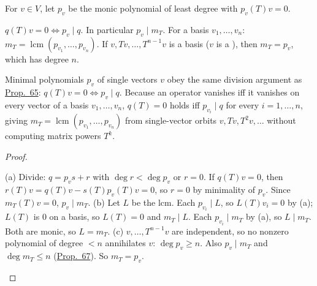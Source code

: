 \documentclass[10pt]{scrartcl}
\begin{document}
\begin{proposition*}\hypertarget{name-f7-one-vector-at-a-time}{}\label{name-f7-one-vector-at-a-time}
  For $v\in V$, let $p_v$ be the monic polynomial of least degree with $p_v(T)v=0$.
  \begin{enumerate}[(a)]
    \ii $q(T)v=0\iff p_v\mid q$. In particular $p_v\mid m_T$.
    \ii For a basis $v_1,\dots,v_n$: $m_T=\operatorname{lcm}(p_{v_1},\dots,p_{v_n})$.
    \ii If $v,Tv,\dots,T^{n-1}v$ is a basis ($v$ is a ), then $m_T=p_v$, which has degree $n$.
  \end{enumerate}
\end{proposition*}
\begin{ideabox}
Minimal polynomials $p_v$ of single vectors $v$ obey the same division argument as \hyperref[prop-65]{Prop.~65}: $q(T)v=0\iff p_v\mid q$. Because an operator vanishes iff it vanishes on every vector of a basis $v_1,\dots,v_n$, $q(T)=0$ holds iff $p_{v_i}\mid q$ for every $i=1,\dots,n$, giving $m_T=\operatorname{lcm}(p_{v_1},\dots,p_{v_n})$ from single-vector orbits $v,Tv,T^2v,\dots$ without computing matrix powers $T^k$.
\end{ideabox}
\begin{proof}
  \begin{steps}
    \ii (a) Divide: $q=p_vs+r$ with $\deg r<\deg p_v$ or $r=0$. If $q(T)v=0$, then $r(T)v=q(T)v-s(T)p_v(T)v=0$, so $r=0$ by minimality of $p_v$. Since $m_T(T)v=0$, $p_v\mid m_T$.
    \ii (b) Let $L$ be the lcm. Each $p_{v_i}\mid L$, so $L(T)v_i=0$ by (a); $L(T)$ is $0$ on a basis, so $L(T)=0$ and $m_T\mid L$.
    \ii Each $p_{v_i}\mid m_T$ by (a), so $L\mid m_T$. Both are monic, so $L=m_T$.
    \ii (c) $v,\dots,T^{n-1}v$ are independent, so no nonzero polynomial of degree $<n$ annihilates $v$: $\deg p_v\ge n$. Also $p_v\mid m_T$ and $\deg m_T\le n$ (\hyperref[prop-67]{Prop.~67}). So $m_T=p_v$.
  \end{steps}
\end{proof}
\end{document}
